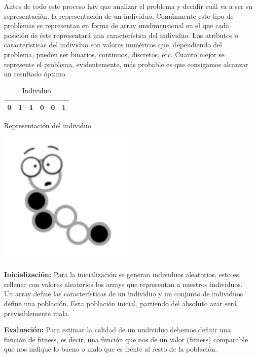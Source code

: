 Antes de todo este proceso hay que analizar el problema y decidir cuál va a ser su representación, la representación de un individuo. Comúnmente este tipo de problemas se representan en forma de array unidimensional en el que cada posición de éste representará una característica del individuo. Los atributos o características del individuo son valores numéricos que, dependiendo del problema, pueden ser binarios, continuos, discretos, etc. Cuanto mejor se represente el problema, evidentemente, más probable es que consigamos alcanzar un resultado óptimo. 

\begin{table}[ht]
\begin{minipage}[b]{0.56\linewidth}
\centering
\begin{tabular}{|c|c|c|c|c|c|}
\hline
 0 & 1 & 1 & 0 & 0 & 1 \\ \hline
\end{tabular}
    \caption{Representación del individuo}
    \label{table:individuo}
\end{minipage}\hfill
\begin{minipage}[b]{0.4\linewidth}

\centering
  \includegraphics[width=0.5\textwidth]{../img/gusanete}\label{fig:f1}
  \caption{Individuo}
\end{minipage}
\end{table}




\textbf{Inicialización:} Para la inicialización se generan individuos aleatorios, esto es, rellenar con valores aleatorios los arrays que representan a nuestros individuos. Un array define las características de un individuo y un conjunto de individuos define una población. Esta población inicial, partiendo del absoluto azar será previsiblemente mala.

\textbf{Evaluación:} Para estimar la calidad de un undividuo debemos definir una función de fitness, es decir, una función que nos de un valor (fitness) comparable que nos indique lo bueno o malo que es frente al resto de la población.

